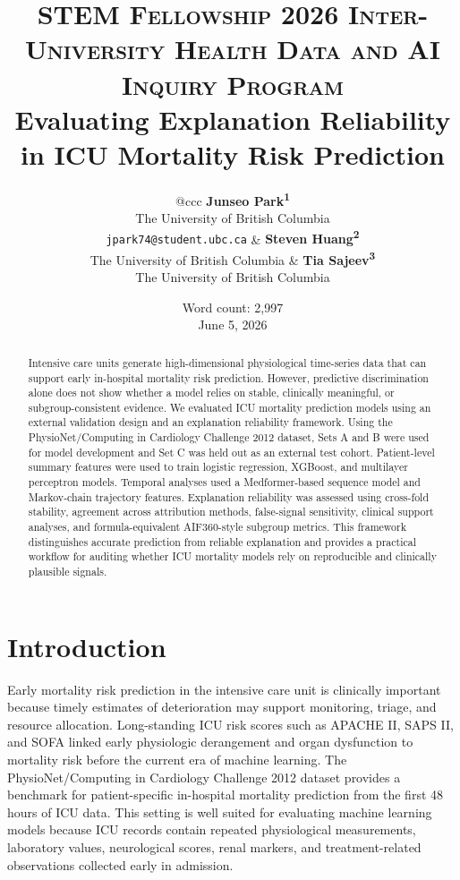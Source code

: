 \documentclass[10pt,twocolumn,letterpaper]{article}
\title{
        \usefont{OT1}{bch}{b}{n}
        \normalfont \normalsize \textsc{STEM Fellowship 2026 Inter-University Health Data and AI Inquiry Program} \\ [10pt]
        \huge Evaluating Explanation Reliability in ICU Mortality Risk Prediction \\
}
\author{%
\small
\begin{tabular*}{\textwidth}{@{\extracolsep{\fill}}ccc}
\parbox[t]{0.31\textwidth}{\centering\textbf{Junseo Park\textsuperscript{1}}\\
{\footnotesize The University of British Columbia}\\
{\footnotesize\texttt{jpark74@student.ubc.ca}}}
&
\parbox[t]{0.31\textwidth}{\centering\textbf{Steven Huang\textsuperscript{2}}\\
{\footnotesize The University of British Columbia}}
&
\parbox[t]{0.31\textwidth}{\centering\textbf{Tia Sajeev\textsuperscript{3}}\\
{\footnotesize The University of British Columbia}}
\\[3.2em]
\multicolumn{3}{c}{%
\begin{tabular*}{0.70\textwidth}{@{\extracolsep{\fill}}cc}
\parbox[t]{0.31\textwidth}{\centering\textbf{Levi Dhanaraj\textsuperscript{4}}\\
{\footnotesize The University of British Columbia}}
&
\parbox[t]{0.31\textwidth}{\centering\textbf{Laura Luo\textsuperscript{5}}\\
{\footnotesize The University of British Columbia}}
\end{tabular*}}
\end{tabular*}
}
\date{
\small
Word count: 2,997\\
June 5, 2026
}
\begin{document}
\maketitle

\begin{abstract}
Intensive care units generate high-dimensional physiological time-series data that can support early in-hospital mortality risk prediction. However, predictive discrimination alone does not show whether a model relies on stable, clinically meaningful, or subgroup-consistent evidence. We evaluated ICU mortality prediction models using an external validation design and an explanation reliability framework. Using the PhysioNet/Computing in Cardiology Challenge 2012 dataset, Sets A and B were used for model development and Set C was held out as an external test cohort. Patient-level summary features were used to train logistic regression, XGBoost, and multilayer perceptron models. Temporal analyses used a Medformer-based sequence model and Markov-chain trajectory features. Explanation reliability was assessed using cross-fold stability, agreement across attribution methods, false-signal sensitivity, clinical support analyses, and formula-equivalent AIF360-style subgroup metrics. This framework distinguishes accurate prediction from reliable explanation and provides a practical workflow for auditing whether ICU mortality models rely on reproducible and clinically plausible signals.
\end{abstract}

\vspace{0.5em}

\section{Introduction}

Early mortality risk prediction in the intensive care unit is clinically important because timely estimates of deterioration may support monitoring, triage, and resource allocation. Long-standing ICU risk scores such as APACHE II, SAPS II, and SOFA linked early physiologic derangement and organ dysfunction to mortality risk before the current era of machine learning\cite{knaus1985apache,legall1993saps,vincent1996sofa}. The PhysioNet/Computing in Cardiology Challenge 2012 dataset provides a benchmark for patient-specific in-hospital mortality prediction from the first 48 hours of ICU data\cite{silva2012physionet}. This setting is well suited for evaluating machine learning models because ICU records contain repeated physiological measurements, laboratory values, neurological scores, renal markers, and treatment-related observations collected early in admission.
\end{document}
